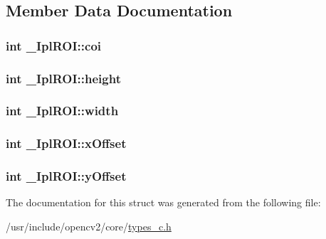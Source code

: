 \subsection{Member Data Documentation}
\hypertarget{struct__IplROI_ad911c8b1bcea1a26e92cd8627e1ae3a1}{
\subsubsection[{coi}]{\setlength{\rightskip}{0pt plus 5cm}int \-\_\-\-Ipl\-R\-O\-I\-::coi}}\label{struct__IplROI_ad911c8b1bcea1a26e92cd8627e1ae3a1}
\hypertarget{struct__IplROI_a3b5425f150fdf07de23b4bafd06d7fb3}{
\subsubsection[{height}]{\setlength{\rightskip}{0pt plus 5cm}int \-\_\-\-Ipl\-R\-O\-I\-::height}}\label{struct__IplROI_a3b5425f150fdf07de23b4bafd06d7fb3}
\hypertarget{struct__IplROI_a53c1aeda57cd135791442e5a1c7bfc9a}{
\subsubsection[{width}]{\setlength{\rightskip}{0pt plus 5cm}int \-\_\-\-Ipl\-R\-O\-I\-::width}}\label{struct__IplROI_a53c1aeda57cd135791442e5a1c7bfc9a}
\hypertarget{struct__IplROI_ae5f153b9938d43ef2e18617d86da9259}{
\subsubsection[{x\-Offset}]{\setlength{\rightskip}{0pt plus 5cm}int \-\_\-\-Ipl\-R\-O\-I\-::x\-Offset}}\label{struct__IplROI_ae5f153b9938d43ef2e18617d86da9259}
\hypertarget{struct__IplROI_a7487c8cdc2887400c7dd49eb0a3361a3}{
\subsubsection[{y\-Offset}]{\setlength{\rightskip}{0pt plus 5cm}int \-\_\-\-Ipl\-R\-O\-I\-::y\-Offset}}\label{struct__IplROI_a7487c8cdc2887400c7dd49eb0a3361a3}


The documentation for this struct was generated from the following file\-:\begin{DoxyCompactItemize}
\item 
/usr/include/opencv2/core/\hyperlink{core_2types__c_8h}{types\-\_\-c.\-h}\end{DoxyCompactItemize}
